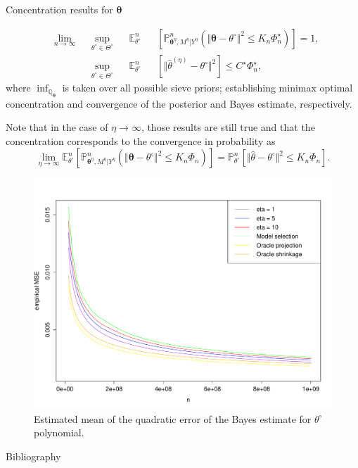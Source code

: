 \documentclass[final,hyperref={pdfpagelabels=false}]{beamer}
\begin{document}
\begin{frame}[t]
\begin{columns}[t]
\begin{column}{.30\textwidth}
\begin{block}{\rule{0pt}{2.5ex} Concentration results for $\boldsymbol{\theta}$}
\begin{enumerate}
\begin{alignat*}{4}
& \lim\limits_{n \rightarrow \infty} && \sup\limits_{\theta^{\circ} \in \Theta^{\circ}}&& \mathbb{E}_{\theta^{\circ}}^{n}&&\left[\mathbb{P}_{\boldsymbol{\theta}^{\eta}, M^{\eta} \vert Y^{\eta}}^{n}\left(\Vert \boldsymbol{\theta} - \theta^{\circ} \Vert^{2} \leq K_{n} \Phi_{n}^{\star} \right)\right] = 1,\\
& &&\sup\limits_{\theta^{\circ}\in \Theta^{\circ}}&&\mathbb{E}_{\theta^{\circ}}^{n}&&\left[\Vert \widehat{\theta}^{\left(\eta\right)} - \theta^{\circ} \Vert^{2}\right] \leq C^{\star} \Phi_{n}^{\star},
\end{alignat*}
where $\inf_{\mathbb{Q}_{\boldsymbol{\theta}}}$ is taken over all possible sieve priors; \textcolor{red!90!black}{establishing minimax optimal concentration and convergence of the posterior and Bayes estimate, respectively}.
\end{enumerate}

\textcolor{red!90!black}{Note that in the case of $\eta \rightarrow \infty$, those results are still true and that the concentration corresponds to the convergence in probability} as
\[\lim\limits_{\eta \rightarrow \infty}\mathbb{E}_{\theta^{\circ}}^{n}\left[\mathbb{P}_{\boldsymbol{\theta}^{\eta}, M^{\eta} \vert Y^{\eta}}^{n}\left(\Vert \boldsymbol{\theta} - \theta^{\circ} \Vert^{2} \leq K_{n} \Phi_{n} \right)\right] = \mathbb{P}_{\theta^{\circ}}^{n}\left[\Vert \widehat{\theta} - \theta^{\circ} \Vert^{2} \leq K_{n} \Phi_{n}\right].\]

\begin{figure}
\centering
  \includegraphics[width=.5\linewidth]{EQM1.pdf}
\caption{Estimated mean of the quadratic error of the Bayes estimate for $\theta^{\circ}$ polynomial.}
\label{EQM}
\end{figure}


\end{block}

\begin{block}{\rule{0pt}{2.5ex} Bibliography}
{}
\end{block}


\end{column}
\end{columns}
\end{frame}
\end{document}
